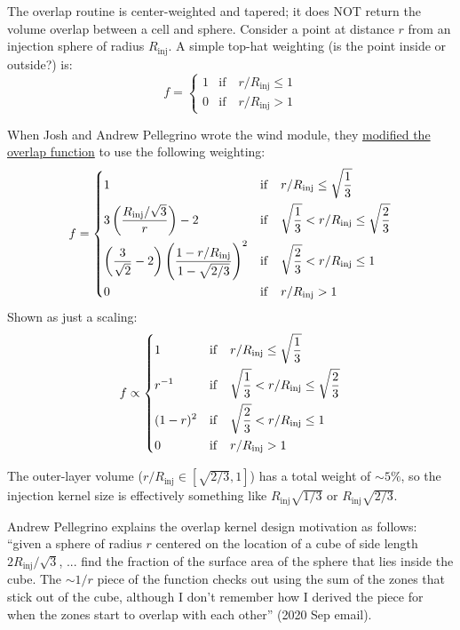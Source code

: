 \documentclass[10pt]{article}
\newcommand*{\mt}{\mathrm}
\begin{document}
The overlap routine is center-weighted and tapered; it does NOT return the
volume overlap between a cell and sphere.
Consider a point at distance $r$ from an injection sphere of radius $R_\mt{inj}$.
A simple top-hat weighting (is the point inside or outside?) is:
\[
    f = \begin{cases}
        1 & \mt{if}\quad r/R_\mt{inj} \leq 1\\
        0 & \mt{if}\quad r/R_\mt{inj} > 1
    \end{cases}
\]

When Josh and Andrew Pellegrino wrote the wind module,
they
\href{https://bitbucket.org/joshuawall/flash4.2.2-rad/commits/e133c54a4a#Lsource/Particles/ParticlesMain/active/Sink/Couple_AMUSE/wind/overlap.F90F72}{modified the overlap function}
to use the following weighting:
\[
    f = \begin{dcases}
        1                              & \mt{if}\quad r/R_\mt{inj} \leq \sqrt{\frac{1}{3}} \\
        3 \left(\frac{R_\mt{inj}/\sqrt{3}}{r}\right) - 2  & \mt{if}\quad \sqrt{\frac{1}{3}} < r/R_\mt{inj} \leq \sqrt{\frac{2}{3}} \\
        \left(\frac{3}{\sqrt{2}} - 2\right)
            \left( \frac{1 - r/R_\mt{inj}}{1-\sqrt{2/3}} \right)^2
            & \mt{if}\quad \sqrt{\frac{2}{3}} < r/R_\mt{inj} \leq 1 \\
        0 & \mt{if}\quad r / R_\mt{inj} > 1
    \end{dcases}
\]
Shown as just a scaling:
\[
    f \propto \begin{dcases}
        1         & \mt{if}\quad r/R_\mt{inj} \leq \sqrt{\frac{1}{3}} \\
        r^{-1}    & \mt{if}\quad \sqrt{\frac{1}{3}} < r/R_\mt{inj} \leq \sqrt{\frac{2}{3}} \\
        (1 - r)^2 & \mt{if}\quad \sqrt{\frac{2}{3}} < r/R_\mt{inj} \leq 1 \\
        0         & \mt{if}\quad r / R_\mt{inj} > 1
    \end{dcases}
\]

The outer-layer volume ($r/R_\mt{inj} \in [\sqrt{2/3}, 1]$) has a total weight
of $\sim 5\%$, so the injection kernel size is effectively something like
$R_\mt{inj}\sqrt{1/3}$ or $R_\mt{inj} \sqrt{2/3}$.

Andrew Pellegrino explains the overlap kernel design motivation as follows:
``given a sphere of radius $r$ centered on the location of a cube of side length
$2 R_\mt{inj}/\sqrt{3}$, ... find the fraction of the surface area of the sphere
that lies inside the cube. The $\sim 1/r$ piece of the function checks out using the
sum of the zones that stick out of the cube, although I don't remember how I
derived the piece for when the zones start to overlap with each other'' (2020
Sep email).
\end{document}
